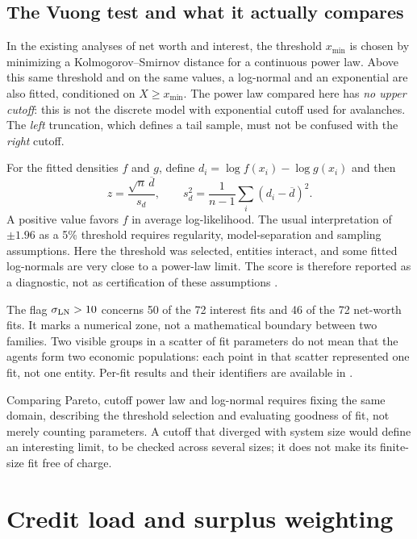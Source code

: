 \subsection{The Vuong test and what it actually compares}
In the existing analyses of net worth and interest, the threshold
$x_{\min}$ is chosen by minimizing a Kolmogorov--Smirnov
distance for a continuous power law. Above this same
threshold and on the same values, a log-normal and an
exponential are also fitted, conditioned on $X\ge x_{\min}$.
The power law compared here has \emph{no upper cutoff}: this
is not the discrete model with exponential cutoff used for avalanches.
The \emph{left} truncation, which defines a tail sample,
must not be confused with the \emph{right} cutoff.

For the fitted densities $f$ and $g$, define
$d_i=\log f(x_i)-\log g(x_i)$ and then
\[
 z=\frac{\sqrt n\,\overline d}{s_d},\qquad
 s_d^2=\frac1{n-1}\sum_i(d_i-\overline d)^2.
\]
A positive value favors $f$ in average log-likelihood.
The usual interpretation of $\pm1.96$ as a 5\%
threshold requires regularity, model-separation
and sampling assumptions. Here the threshold was selected, entities
interact, and some fitted log-normals are very close
to a power-law limit. The score is therefore reported as a diagnostic,
not as certification of these assumptions \cite{vuong}.

The flag $\sigma_{\rm LN}>10$ concerns 50 of the 72 interest
fits and 46 of the 72 net-worth fits. It marks a
numerical zone, not a mathematical boundary between two families.
Two visible groups in a scatter of fit parameters do not
mean that the agents form two economic populations:
each point in that scatter represented one fit, not one entity.
Per-fit results and their identifiers are available in
.

Comparing Pareto, cutoff power law and log-normal requires
fixing the same domain, describing the threshold selection and evaluating
goodness of fit, not merely counting parameters. A cutoff
that diverged with system size would define an interesting
limit, to be checked across several sizes; it does not make
its finite-size fit free of charge.

\section{Credit load and surplus weighting}
